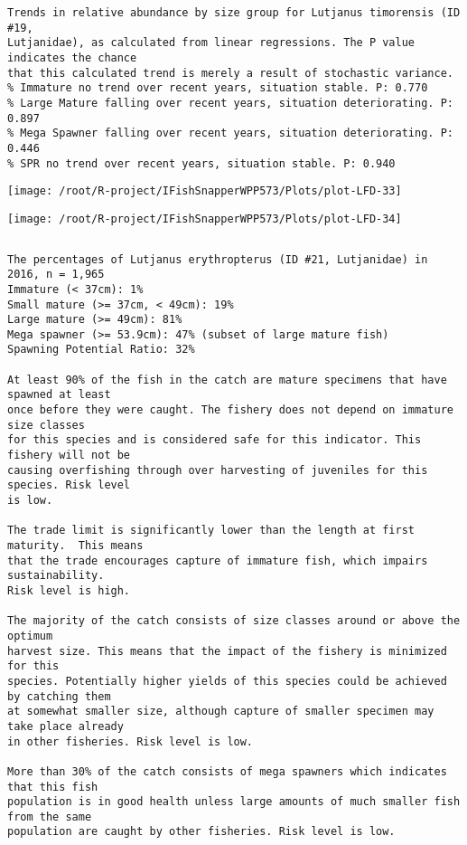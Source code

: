 \documentclass{report}\usepackage[]{graphicx}\usepackage[]{color}
\makeatletter
\def\maxwidth{ %
  \ifdim\Gin@nat@width>\linewidth
    \linewidth
  \else
    \Gin@nat@width
  \fi
}
\newenvironment{kframe}{%
 \def\at@end@of@kframe{}%
 \ifinner\ifhmode%
  \def\at@end@of@kframe{\end{minipage}}%
  \begin{minipage}{\columnwidth}%
 \fi\fi%
 \def\FrameCommand##1{\hskip\@totalleftmargin \hskip-\fboxsep
 \colorbox{shadecolor}{##1}\hskip-\fboxsep
     \hskip-\linewidth \hskip-\@totalleftmargin \hskip\columnwidth}%
 \MakeFramed {\advance\hsize-\width
   \@totalleftmargin\z@ \linewidth\hsize
   \@setminipage}}%
 {\par\unskip\endMakeFramed%
 \at@end@of@kframe}
\newenvironment{knitrout}{}{} %
\makeatother
\begin{document}
\begin{knitrout}
\begin{kframe}
\begin{verbatim}
Trends in relative abundance by size group for Lutjanus timorensis (ID #19,
Lutjanidae), as calculated from linear regressions. The P value indicates the chance
that this calculated trend is merely a result of stochastic variance.
% Immature no trend over recent years, situation stable. P: 0.770
% Large Mature falling over recent years, situation deteriorating. P: 0.897
% Mega Spawner falling over recent years, situation deteriorating. P: 0.446
% SPR no trend over recent years, situation stable. P: 0.940
\end{verbatim}
\end{kframe}
\texttt{[image: /root/R-project/IFishSnapperWPP573/Plots/plot-LFD-33]} 

\texttt{[image: /root/R-project/IFishSnapperWPP573/Plots/plot-LFD-34]} 
\begin{kframe}\begin{verbatim}
\end{verbatim}
\end{kframe}
\clearpage
\newpage
\begin{kframe}\begin{verbatim}The percentages of Lutjanus erythropterus (ID #21, Lutjanidae) in 2016, n = 1,965
Immature (< 37cm): 1%
Small mature (>= 37cm, < 49cm): 19%
Large mature (>= 49cm): 81%
Mega spawner (>= 53.9cm): 47% (subset of large mature fish)
Spawning Potential Ratio: 32%
 
At least 90% of the fish in the catch are mature specimens that have spawned at least
once before they were caught. The fishery does not depend on immature size classes
for this species and is considered safe for this indicator. This fishery will not be
causing overfishing through over harvesting of juveniles for this species. Risk level
is low.

The trade limit is significantly lower than the length at first maturity.  This means
that the trade encourages capture of immature fish, which impairs sustainability.
Risk level is high.

The majority of the catch consists of size classes around or above the optimum
harvest size. This means that the impact of the fishery is minimized for this
species. Potentially higher yields of this species could be achieved by catching them
at somewhat smaller size, although capture of smaller specimen may take place already
in other fisheries. Risk level is low.

More than 30% of the catch consists of mega spawners which indicates that this fish
population is in good health unless large amounts of much smaller fish from the same
population are caught by other fisheries. Risk level is low.
 

\end{verbatim}
\end{kframe}
\end{knitrout}
\end{document}
